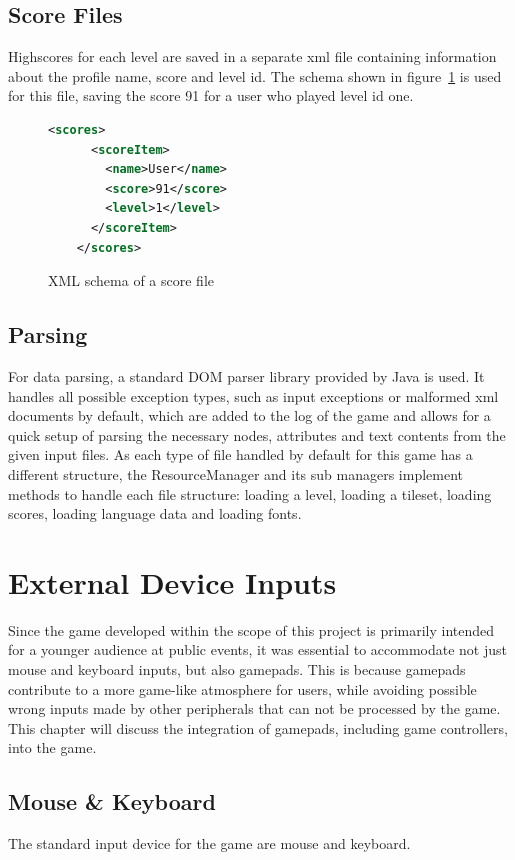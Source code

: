 \subsection{Score Files}\label{subsec:score-files}
Highscores for each level are saved in a separate xml file containing information about the profile name, score and level id.
The schema shown in figure~\ref{fig:xml-score} is used for this file, saving the score 91 for a user who played level id one.
\\
\begin{figure}
\begin{lstlisting}[language=XML,label={lst:score-xml}]
    <scores>
      <scoreItem>
        <name>User</name>
        <score>91</score>
        <level>1</level>
      </scoreItem>
    </scores>
\end{lstlisting}
    \caption{XML schema of a score file}
    \label{fig:xml-score}
\end{figure}

\subsection{Parsing}\label{subsec:parsing}
For data parsing, a standard DOM parser library provided by Java is used.
It handles all possible exception types, such as input exceptions or malformed xml documents by default, which are added to the log of the game
and allows for a quick setup of parsing
the necessary nodes, attributes and text contents from the given input files.
As each type of file handled by default for this game has a different structure, the ResourceManager and its sub managers implement methods to handle
each file structure: loading a level, loading a tileset, loading scores, loading language data and loading fonts.

\section{External Device Inputs}\label{sec:external-device-inputs}
Since the game developed within the scope of this project is primarily intended for a younger audience at public events,
it was essential to accommodate not just mouse and keyboard inputs, but also gamepads.
This is because gamepads contribute to a more game-like atmosphere for users, while avoiding possible wrong inputs made by
other peripherals that can not be processed by the game.
This chapter will discuss the integration of gamepads, including game controllers, into the game.
\subsection{Mouse \& Keyboard}\label{subsec:mouse-&-keyboard}
The standard input device for the game are mouse and keyboard.
